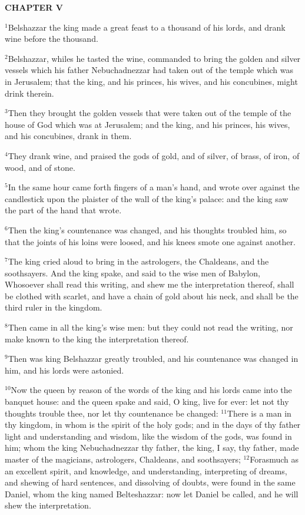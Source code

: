\documentclass[12pt]{article}
\begin{document}
\begin{center}
\textbf{\small CHAPTER V}
\end{center}
$^{1}$Belshazzar the king made a great feast to a thousand of his lords,
and drank wine before the thousand.


$^{2}$Belshazzar, whiles he tasted the wine, commanded to bring the
golden and silver vessels which his father Nebuchadnezzar had taken
out of the temple which was in Jerusalem; that the king, and his
princes, his wives, and his concubines, might drink therein.


$^{3}$Then they brought the golden vessels that were taken out of the
temple of the house of God which was at Jerusalem; and the king, and
his princes, his wives, and his concubines, drank in them.


$^{4}$They drank wine, and praised the gods of gold, and of silver, of
brass, of iron, of wood, and of stone.


$^{5}$In the same hour came forth fingers of a man's hand, and wrote
over against the candlestick upon the plaister of the wall of the
king's palace: and the king saw the part of the hand that wrote.


$^{6}$Then the king's countenance was changed, and his thoughts troubled
him, so that the joints of his loins were loosed, and his knees smote
one against another.


$^{7}$The king cried aloud to bring in the astrologers, the Chaldeans,
and the soothsayers. And the king spake, and said to the wise men of
Babylon, Whosoever shall read this writing, and shew me the
interpretation thereof, shall be clothed with scarlet, and have a
chain of gold about his neck, and shall be the third ruler in the
kingdom.


$^{8}$Then came in all the king's wise men: but they could not read the
writing, nor make known to the king the interpretation thereof.


$^{9}$Then was king Belshazzar greatly troubled, and his countenance was
changed in him, and his lords were astonied.


$^{10}$Now the queen by reason of the words of the king and his lords
came into the banquet house: and the queen spake and said, O king,
live for ever: let not thy thoughts trouble thee, nor let thy
countenance be changed: $^{11}$There is a man in thy kingdom, in whom is
the spirit of the holy gods; and in the days of thy father light and
understanding and wisdom, like the wisdom of the gods, was found in
him; whom the king Nebuchadnezzar thy father, the king, I say, thy
father, made master of the magicians, astrologers, Chaldeans, and
soothsayers; $^{12}$Forasmuch as an excellent spirit, and knowledge, and
understanding, interpreting of dreams, and shewing of hard sentences,
and dissolving of doubts, were found in the same Daniel, whom the king
named Belteshazzar: now let Daniel be called, and he will shew the
interpretation.
\end{document}
